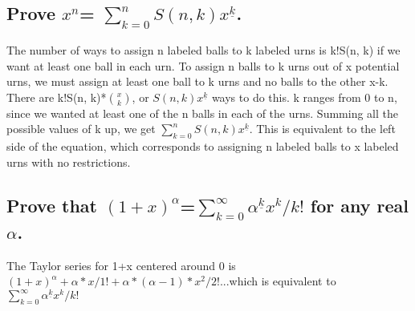 \documentclass[11pt,twosided]{article}
\begin{document}

\subsection{Prove $x^n$= $\sum_{k=0}^{n} {S(n, k)x^{\underline{k}}}$.}

The number of ways to assign n labeled balls to k labeled urns is k!S(n, k) if we want at least one ball in each urn. To assign n balls to k urns out of x potential urns, we must assign at least one ball to k urns and no balls to the other x-k. There are k!S(n, k)*${x \choose k}$, or $S(n, k)x^{\underline{k}}$ ways to do this. k ranges from 0 to n, since we wanted at least one of the n balls in each of the urns. Summing all the possible values of k up, we get $\sum_{k=0}^{n} {S(n, k)x^{\underline{k}}}$. This is equivalent to the left side of the equation, which corresponds to assigning n labeled balls to x labeled urns with no restrictions. 


\subsection{Prove that $(1+x)^\alpha$=$\sum_{k=0}^{\infty} {\alpha^{\underline{k}}x^k/k!}$ for any real $ \alpha$.}
The Taylor series for 1+x centered around 0 is $(1+x)^\alpha+\alpha*x/1!+\alpha*(\alpha-1)*x^2/2!$...which is equivalent to $\sum_{k=0}^{\infty}{\alpha^{\underline{k}}x^k/k!}$
\end{document}

